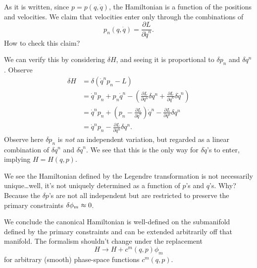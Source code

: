 As it is written, since $p=p(q,\dot{q})$, the Hamiltonian is a function
of the positions and velocities. We claim that velocities enter only
through the combinations of
\begin{equation}
  p_{n}(q,\dot{q}) = \frac{\partial L}{\partial\dot{q}^{n}}.
\end{equation}
How to check this claim?

We can verify this by considering $\delta H$, and seeing it is
proportional to $\delta p_{n}$ and $\delta q^{n}$. Observe
\begin{subequations}
\begin{align}
\delta H &= \delta(\dot{q}^{n}p_{n} - L)\\
&=\dot{q}^{n}p_{n}+p_{n}\dot{q}^{n}
  -\left(\frac{\partial L}{\partial q^{n}}\delta q^{n}
         + \frac{\partial L}{\partial\dot{q}^{n}}\delta\dot{q}^{n}\right)\\
&=\dot{q}^{n}p_{n}
   +\left(p_{n}-\frac{\partial L}{\partial\dot{q}^{n}}\right)\dot{q}^{n}
  -\frac{\partial L}{\partial q^{n}}\delta q^{n}\\
&=\dot{q}^{n}p_{n} -\frac{\partial L}{\partial q^{n}}\delta q^{n}.
\end{align}
\end{subequations}
Observe here $\delta p_{n}$ is \emph{not} an independent variation, but
regarded as a linear combination of $\delta q^{n}$ and
$\delta\dot{q}^{n}$. We see that this is the only way for
$\delta\dot{q}$'s to enter, implying $H=H(q,p)$.

We see the Hamiltonian defined by the Legendre transformation is not
necessarily unique\dots well, it's not uniquely determined as a function
of $p$'s and $q$'s. Why? Because the $\delta p$'s are not all
independent but are restricted to preserve the primary constraints
$\delta\phi_{m}\approx0$.

We conclude the canonical Hamiltonian is well-defined on the submanifold
defined by the primary constraints and can be extended arbitrarily off
that manifold. The formalism shouldn't change under the replacement
\begin{equation}
  H\to H+c^{m}(q,p)\phi_{m}
\end{equation}
for arbitrary (smooth) phase-space functions $c^{m}(q,p)$.

